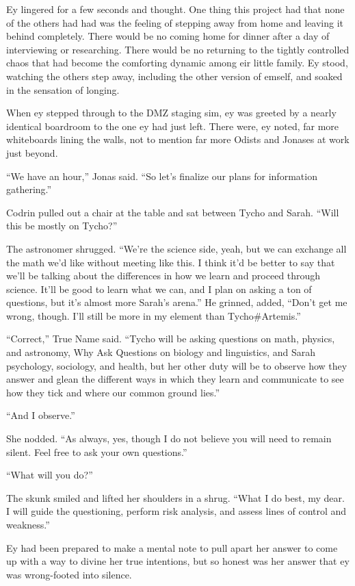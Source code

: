Ey lingered for a few seconds and thought. One thing this project had that none of the others had had was the feeling of stepping away from home and leaving it behind completely. There would be no coming home for dinner after a day of interviewing or researching. There would be no returning to the tightly controlled chaos that had become the comforting dynamic among eir little family. Ey stood, watching the others step away, including the other version of emself, and soaked in the sensation of longing.

When ey stepped through to the DMZ staging sim, ey was greeted by a nearly identical boardroom to the one ey had just left. There were, ey noted, far more whiteboards lining the walls, not to mention far more Odists and Jonases at work just beyond.

``We have an hour,'' Jonas said. ``So let's finalize our plans for information gathering.''

Codrin pulled out a chair at the table and sat between Tycho and Sarah. ``Will this be mostly on Tycho?''

The astronomer shrugged. ``We're the science side, yeah, but we can exchange all the math we'd like without meeting like this. I think it'd be better to say that we'll be talking about the differences in how we learn and proceed through science. It'll be good to learn what we can, and I plan on asking a ton of questions, but it's almost more Sarah's arena.'' He grinned, added, ``Don't get me wrong, though. I'll still be more in my element than Tycho\#Artemis.''

``Correct,'' True Name said. ``Tycho will be asking questions on math, physics, and astronomy, Why Ask Questions on biology and linguistics, and Sarah psychology, sociology, and health, but her other duty will be to observe how they answer and glean the different ways in which they learn and communicate to see how they tick and where our common ground lies.''

``And I observe.''

She nodded. ``As always, yes, though I do not believe you will need to remain silent. Feel free to ask your own questions.''

``What will you do?''

The skunk smiled and lifted her shoulders in a shrug. ``What I do best, my dear. I will guide the questioning, perform risk analysis, and assess lines of control and weakness.''

Ey had been prepared to make a mental note to pull apart her answer to come up with a way to divine her true intentions, but so honest was her answer that ey was wrong-footed into silence.

